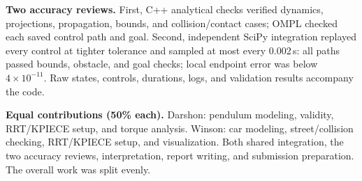 \documentclass[10pt,letterpaper]{article}
\begin{document}
\textbf{Two accuracy reviews.}
First, C++ analytical checks verified dynamics, projections, propagation, bounds, and collision/contact cases; OMPL checked each saved control path and goal. Second, independent SciPy integration replayed every control at tighter tolerance and sampled at most every 0.002\,s: all paths passed bounds, obstacle, and goal checks; local endpoint error was below $4\times10^{-11}$. Raw states, controls, durations, logs, and validation results accompany the code.

\textbf{Equal contributions (50\% each).}
Darshon: pendulum modeling, validity, RRT/KPIECE setup, and torque analysis. Winson: car modeling, street/collision checking, RRT/KPIECE setup, and visualization. Both shared integration, the two accuracy reviews, interpretation, report writing, and submission preparation. The overall work was split evenly.
\end{document}
